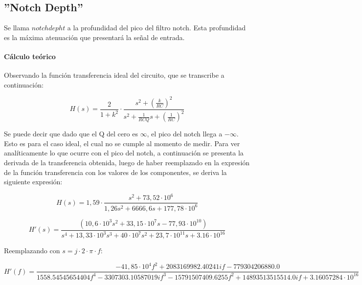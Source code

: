 \subsection{ ''Notch Depth''}

Se llama $notch depht$ a la profundidad del pico del filtro notch. Esta profundidad es la m\'axima atenuaci\'on que presentar\'a la se\~nal de entrada.

\paragraph*{C\'alculo te\'orico}

Observando la funci\'on transferencia ideal del circuito, que se transcribe a continuaci\'on:

\begin{equation}
H(s) = \frac{2}{1+k^2} \cdot \frac{s^2 + \left( \frac{k}{RC}\right)^2}{s^2 + \frac{1}{RCQ} s + \left(\frac{1}{RC}\right)^2}
\label{vovi_simple2}
\end{equation}

Se puede decir que dado que el Q del cero es $\infty$, el pico del notch llega a $-\infty$. Esto es para el caso ideal, el cual no se cumple al momento de medir. Para ver anal\'iticamente lo que ocurre con el pico del notch, a continuaci\'on se presenta la derivada de la transferencia obtenida, luego de haber reemplazado en la expresi\'on de la funci\'on transferencia con los valores de los componentes, se deriva la siguiente expresi\'on:

\begin{equation}
H(s) = 1,59 \cdot \frac{s^2+73,52 \cdot 10^6}{1,26 s^2 + 6666,6 s + 177,78 \cdot 10^6}
\end{equation}

\begin{equation}
H'(s) = \frac{\left(10,6 \cdot 10^3 s^{2} + 33,15 \cdot 10^7 s - 77,93 \cdot 10^{10}\right)}{s^{4} + 13,33 \cdot 10^3 s^{3} + 40 \cdot 10^7 s^{2} + 23,7 \cdot 10^11 s + 3.16 \cdot 10^{16}}
\label{deriv}
\end{equation}

Reemplazando con $s=j\cdot2\cdot \pi \cdot f$:

\begin{equation}
H'(f) = \frac{- 41,85  \cdot 10^4 f^{2} + 2083169982.40241 i f - 779304206880.0}{1558.54545654404 f^{4} - 3307303.10587019 i f^{3} - 15791507409.6255 f^{2} + 14893513515514.0 i f + 3.16057284 \cdot 10^{16}}
\end{equation}

